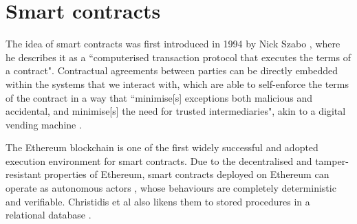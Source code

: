 \section{Smart contracts}

The idea of smart contracts was first introduced in 1994 by Nick Szabo \cite{nickszabosmartcontracts1},
where he describes it as a ``computerised transaction protocol that executes the terms of a contract". 
Contractual agreements between parties can be directly embedded within the systems that we 
interact with, which are able to self-enforce the terms of the contract
in a way that ``minimise[s] exceptions both malicious and accidental, and minimise[s] the need
for trusted intermediaries", akin to a digital vending machine \cite{nickszabosmartcontracts2}.

The Ethereum blockchain is one of the first widely successful and adopted execution environment for 
smart contracts. Due to the decentralised and tamper-resistant properties of Ethereum, 
smart contracts deployed on Ethereum can operate as autonomous actors \cite{smartcontractsforiot},
whose behaviours are completely deterministic and verifiable. Christidis et al also likens them to 
stored procedures in a relational database \cite{smartcontractsforiot}. 



